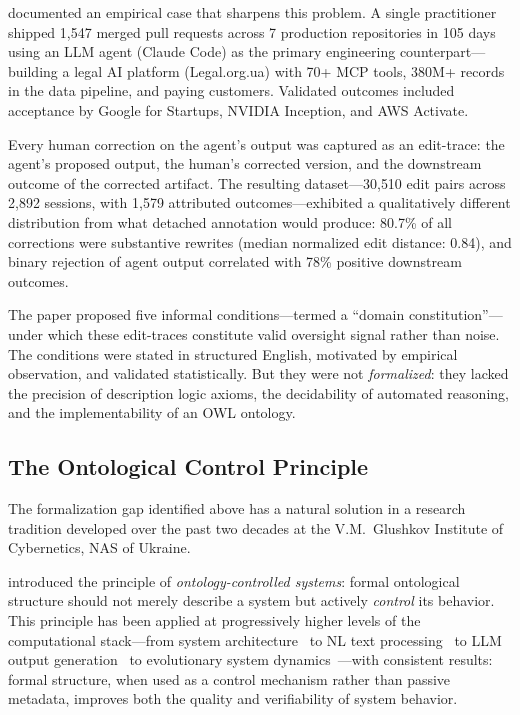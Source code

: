\documentclass[11pt]{article}
\begin{document}
\citet{ovcharov2026edittrace} documented an empirical case that sharpens this problem.
A single practitioner shipped 1{,}547 merged pull requests across 7 production repositories in 105 days using an LLM agent (Claude Code) as the primary engineering counterpart---building a legal AI platform (Legal.org.ua) with 70+ MCP tools, 380M+ records in the data pipeline, and paying customers.
Validated outcomes included acceptance by Google for Startups, NVIDIA Inception, and AWS Activate.

Every human correction on the agent's output was captured as an edit-trace: the agent's proposed output, the human's corrected version, and the downstream outcome of the corrected artifact.
The resulting dataset---30{,}510 edit pairs across 2{,}892 sessions, with 1{,}579 attributed outcomes---exhibited a qualitatively different distribution from what detached annotation would produce: 80.7\% of all corrections were substantive rewrites (median normalized edit distance: 0.84), and binary rejection of agent output correlated with 78\% positive downstream outcomes.

The paper proposed five informal conditions---termed a ``domain constitution''---under which these edit-traces constitute valid oversight signal rather than noise.
The conditions were stated in structured English, motivated by empirical observation, and validated statistically.
But they were not \emph{formalized}: they lacked the precision of description logic axioms, the decidability of automated reasoning, and the implementability of an OWL ontology.

\subsection{The Ontological Control Principle}
\label{sec:principle}

The formalization gap identified above has a natural solution in a research tradition developed over the past two decades at the V.M.~Glushkov Institute of Cybernetics, NAS of Ukraine.

\citet{palagin2006architecture} introduced the principle of \emph{ontology-controlled systems}: formal ontological structure should not merely describe a system but actively \emph{control} its behavior.
This principle has been applied at progressively higher levels of the computational stack---from system architecture~\citep{palagin2006architecture} to NL text processing~\citep{palagin2012knowledge, palagin2020distributional} to LLM output generation~\citep{palagin2023ontochatgpt, palagin2024neural} to evolutionary system dynamics~\citep{palagin2025evolutionary}---with consistent results: formal structure, when used as a control mechanism rather than passive metadata, improves both the quality and verifiability of system behavior.
\end{document}
